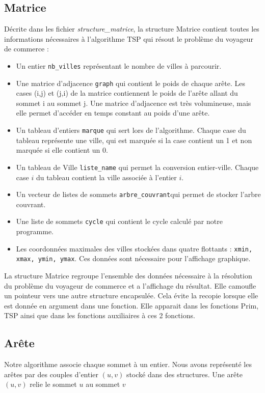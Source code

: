 \documentclass[a4paper,11pt]{article}
\begin{document}
\subsection{Matrice} %
Décrite dans les fichier \emph{structure\_matrice}, la structure \textsf{Matrice} contient toutes les informations nécessaires à l'algorithme TSP qui résout le problème du voyageur de commerce :
\begin{itemize}
\renewcommand{\FrenchLabelItem}{\textbullet}
\item Un entier \texttt{nb\_villes} représentant le nombre de villes à parcourir.
\item Une matrice d'adjacence \texttt{graph} qui contient le poids de chaque arête. Les cases (i,j) et (j,i) de la matrice contiennent le poids de l'arête allant du sommet i au sommet j. Une matrice d'adjacence est très volumineuse, mais elle permet d'accéder en temps constant au poids d'une arête.
\item Un tableau d'entiers \texttt{marque} qui sert lors de l'algorithme. Chaque case du tableau représente une ville, qui est marquée si la case contient un 1 et non marquée si elle contient un 0.
\item Un tableau de \textsf{Ville} \texttt{liste\_name} qui permet la conversion entier-ville. Chaque case $i$ du tableau contient la ville associée à l'entier $i$.
\item Un vecteur de listes de sommets \texttt{arbre\_couvrant}qui permet de stocker l'arbre couvrant.
\item Une liste de sommets \texttt{cycle} qui contient le cycle calculé par notre programme.
\item Les coordonnées maximales des villes stockées dans quatre flottants : \texttt{xmin, xmax, ymin, ymax}. Ces données sont nécessaire pour l'affichage graphique.
\end{itemize}

La structure Matrice regroupe l'ensemble des données nécessaire à la résolution du problème du voyageur de commerce et a l'affichage du résultat.
Elle camoufle un pointeur vers une autre structure encapsulée. Cela évite la recopie lorsque elle est donnée en argument dans une fonction. Elle apparait dans les fonctions Prim, TSP ainsi que dans les fonctions auxiliaires à ces 2 fonctions.

\subsection{Arête}
Notre algorithme associe chaque sommet à un entier. Nous avons représenté les arêtes par des couples d'entier $(u, v)$ stocké dans des structures. Une arête $(u, v)$ relie le sommet $u$ au sommet $v$
\end{document}
